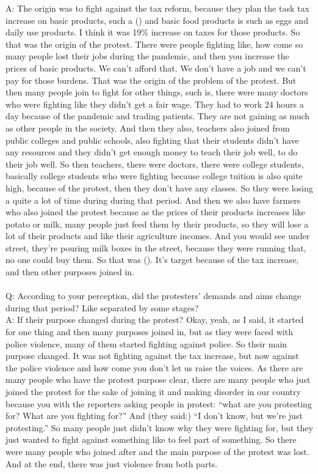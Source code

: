\documentclass{phyasgn}\usepackage{nag}
\begin{document}
A: The origin was to fight against the tax reform, because they plan the task tax increase on basic products, such a () and basic food products is such as eggs and daily use products. I think it was 19\% increase on taxes for those products. So that was the origin of the protest. There were people fighting like, how come so many people lost their jobs during the pandemic, and then you increase the prices of basic products. We can't afford that. We don't have a job and we can't pay for those burdens. That was the origin of the problem of the protest. But then many people join to fight for other things, such is, there were many doctors who were fighting like they didn't get a fair wage. They had to work 24 hours a day because of the pandemic and trading patients. They are not gaining as much as other people in the society. And then they also, teachers also joined from public colleges and public schools, also fighting that their students didn't have any resources and they didn't get enough money to teach their job well, to do their job well. So then teachers, there were doctors, there were college students, basically college students who were fighting because college tuition is also quite high, because of the protest, then they don't have any classes. So they were losing a quite a lot of time during during that period. And then we also have farmers who also joined the protest because as the prices of their products increases like potato or milk, many people just feed them by their products, so they will lose a lot of their products and like their agriculture incomes. And you would see under street, they're pouring milk boxes in the street, because they were running that, no one could buy them. So that was (). It's target because of the tax increase, and then other purposes joined in.\\
\\
Q: According to your perception, did the protesters’ demands and aims change during that period? Like separated by some stages?\\
A: If their purpose changed during the protest? Okay, yeah, as I said, it started for one thing and then many purposes joined in, but as they were faced with police violence, many of them started fighting against police. So their main purpose changed. It was not fighting against the tax increase, but now against the police violence and how come you don't let us raise the voices. As there are many people who have the protest purpose clear, there are many people who just joined the protest for the sake of joining it and making disorder in our country because you with the reporters asking people in protest: “what are you protesting for? What are you fighting for?” And (they said:) “I don't know, but we're just protesting.” So many people just didn't know why they were fighting for, but they just wanted to fight against something like to feel part of something. So there were many people who joined after and the main purpose of the protest was lost. And at the end, there was just violence from both parts.\\
\end{document}
